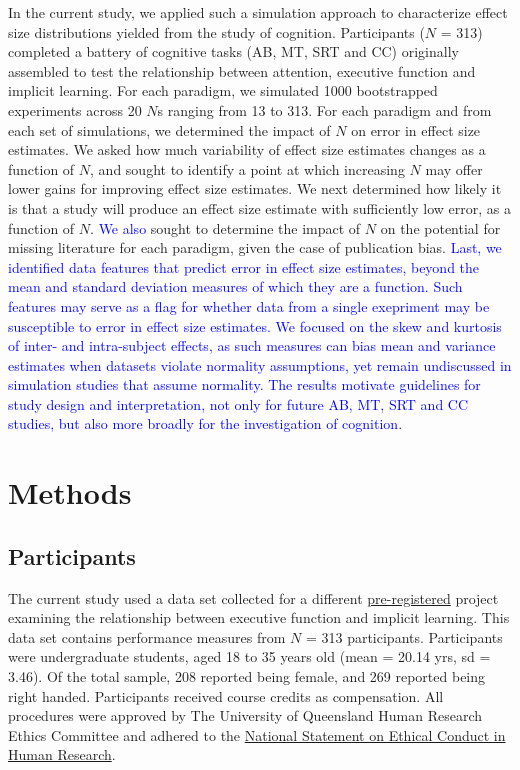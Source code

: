 \documentclass[
  man]{apa6}
\begin{document}
In the current study, we applied such a simulation approach to characterize effect size distributions yielded from the study of cognition. Participants (\(N\) = 313) completed a battery of cognitive tasks (AB, MT, SRT and CC) originally assembled to test the relationship between attention, executive function and implicit learning. For each paradigm, we simulated 1000 bootstrapped experiments across 20 \(N\)s ranging from 13 to 313. For each paradigm and from each set of simulations, we determined the impact of \(N\) on error in effect size estimates. We asked how much variability of effect size estimates changes as a function of \(N\), and sought to identify a point at which increasing \(N\) may offer lower gains for improving effect size estimates. We next determined how likely it is that a study will produce an effect size estimate with sufficiently low error, as a function of \(N\). \textcolor{blue}{We also} sought to determine the impact of \(N\) on the potential for missing literature for each paradigm, given the case of publication bias. \textcolor{blue}{Last, we identified data features that predict error in effect size estimates, beyond the mean and standard deviation measures of which they are a function. Such features may serve as a flag for whether data from a single exepriment may be susceptible to error in effect size estimates. We focused on the skew and kurtosis of inter- and intra-subject effects, as such measures can bias mean and variance estimates when datasets violate normality assumptions, yet remain undiscussed in simulation studies that assume normality. The results motivate guidelines for study design and interpretation, not only for future AB, MT, SRT and CC studies, but also more broadly for the investigation of cognition}.

\hypertarget{methods}{%
\section{Methods}\label{methods}}

\label{sec:Method}

\hypertarget{participants}{%
\subsection{Participants}\label{participants}}

\label{sec:Participants}

The current study used a data set collected for a different \href{https://osf.io/nxysg}{pre-registered} project examining the relationship between executive function and implicit learning. This data set contains performance measures from \(N\) = 313 participants. Participants were undergraduate students, aged 18 to 35 years old (mean = 20.14 yrs, sd = 3.46). Of the total sample, 208 reported being female, and 269 reported being right handed. Participants received course credits as compensation. All procedures were approved by The University of Queensland Human Research Ethics Committee and adhered to the \href{https://www.nhmrc.gov.au/about-us/publications/national-statement-ethical-conduct-human-research-2007-updated-2018}{National Statement on Ethical Conduct in Human Research}.
\end{document}
